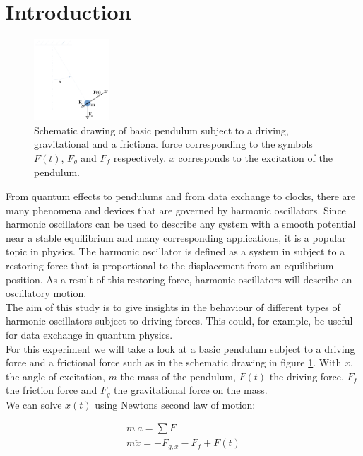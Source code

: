 \section{Introduction}
\begin{figure}
	\includegraphics[width=0.25\textwidth]{figures/pendulum.png}
	\caption{Schematic drawing of basic pendulum subject to a driving, gravitational and a frictional force corresponding to the symbols $F(t)$, $F_g$ and $F_f$ respectively. $x$ corresponds to the excitation of the pendulum.}
	\label{fig_pendulum}
\end{figure}
	
From quantum effects to pendulums and from data exchange to clocks, there are many phenomena and devices that are governed by harmonic oscillators. Since harmonic oscillators can be used to describe any system with a smooth potential near a stable equilibrium and many corresponding applications, it is a popular topic in physics. The harmonic oscillator is defined as a system in subject to a restoring force that is proportional to the displacement from an equilibrium position. As a result of this restoring force, harmonic oscillators will describe an oscillatory motion. \\
The aim of this study is to give insights in the behaviour of different types of harmonic oscillators subject to driving forces. This could, for example, be useful for data exchange in quantum physics. \\
For this experiment we will take a look at a basic pendulum subject to a driving force and a frictional force such as in the schematic drawing in figure \ref{fig_pendulum}. With $x$, the angle of excitation, $m$ the mass of the pendulum, $F(t)$ the driving force, $F_f$ the friction force and $F_g$ the gravitational force on the mass. \\
We can solve $x(t)$ using Newtons second law of motion:

\begin{align*}
	m \: a = \sum F  \\
	m \ddot{x} = - F_{g,x} - F_f + F(t)
\end{align*}

